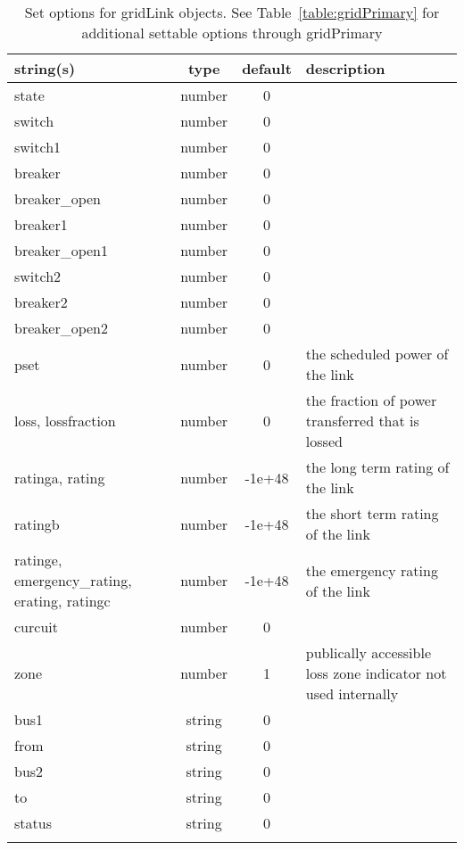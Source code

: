 \begin{longtable}{p{5cm} c c p{7cm}}
string(s) & type & default & description \\
\hline
state & number & 0 & \\
switch & number & 0 & \\
switch1 & number & 0 & \\
breaker & number & 0 & \\
breaker\_open & number & 0 & \\
breaker1 & number & 0 & \\
breaker\_open1 & number & 0 & \\
switch2 & number & 0 & \\
breaker2 & number & 0 & \\
breaker\_open2 & number & 0 & \\
pset & number & 0 & the scheduled power of the link\\
loss, lossfraction & number & 0 & the fraction of power transferred that is lossed\\
ratinga, rating & number & -1e+48 & the long term rating of the link\\
ratingb & number & -1e+48 & the short term rating of the link\\
ratinge, emergency\_rating, erating, ratingc & number & -1e+48 & the emergency rating of the link\\
curcuit & number & 0 & \\
zone & number & 1 & publically accessible loss zone indicator not used internally\\
bus1 & string & 0 & \\
from & string & 0 & \\
bus2 & string & 0 & \\
to & string & 0 & \\
status & string & 0 & \\
\hline
\caption{Set options for gridLink objects. See Table~\ref{table:gridPrimary} for additional settable options through gridPrimary}
\label{table:gridLink}
\end{longtable}

